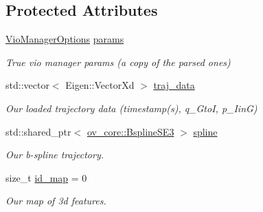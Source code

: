 \subsection*{Protected Attributes}
\begin{DoxyCompactItemize}
\item 
\mbox{\label{classov__msckf_1_1Simulator_aaf26d06a73b0773018df69382dc2b3bc}} 
\hyperlink{structov__msckf_1_1VioManagerOptions}{Vio\+Manager\+Options} \hyperlink{classov__msckf_1_1Simulator_aaf26d06a73b0773018df69382dc2b3bc}{params}
\begin{DoxyCompactList}\small\item\em True vio manager params (a copy of the parsed ones) \end{DoxyCompactList}\item 
\mbox{\label{classov__msckf_1_1Simulator_af1e667cafe40b3f648ebd773153de72e}} 
std\+::vector$<$ Eigen\+::\+Vector\+Xd $>$ \hyperlink{classov__msckf_1_1Simulator_af1e667cafe40b3f648ebd773153de72e}{traj\+\_\+data}
\begin{DoxyCompactList}\small\item\em Our loaded trajectory data (timestamp(s), q\+\_\+\+GtoI, p\+\_\+\+IinG) \end{DoxyCompactList}\item 
\mbox{\label{classov__msckf_1_1Simulator_a4dd11bf8b7d9df46ea335ef7fa10271e}} 
std\+::shared\+\_\+ptr$<$ \hyperlink{classov__core_1_1BsplineSE3}{ov\+\_\+core\+::\+Bspline\+S\+E3} $>$ \hyperlink{classov__msckf_1_1Simulator_a4dd11bf8b7d9df46ea335ef7fa10271e}{spline}
\begin{DoxyCompactList}\small\item\em Our b-\/spline trajectory. \end{DoxyCompactList}\item 
\mbox{\label{classov__msckf_1_1Simulator_a125ad6c49a2f30934a1b233534fbfb27}} 
size\+\_\+t \hyperlink{classov__msckf_1_1Simulator_a125ad6c49a2f30934a1b233534fbfb27}{id\+\_\+map} = 0
\begin{DoxyCompactList}\small\item\em Our map of 3d features. \end{DoxyCompactList}\item 
\mbox{\label{classov__msckf_1_1Simulator_a51326add48004cb3c178d1a18ec7bd93}} 

\end{DoxyCompactItemize}
